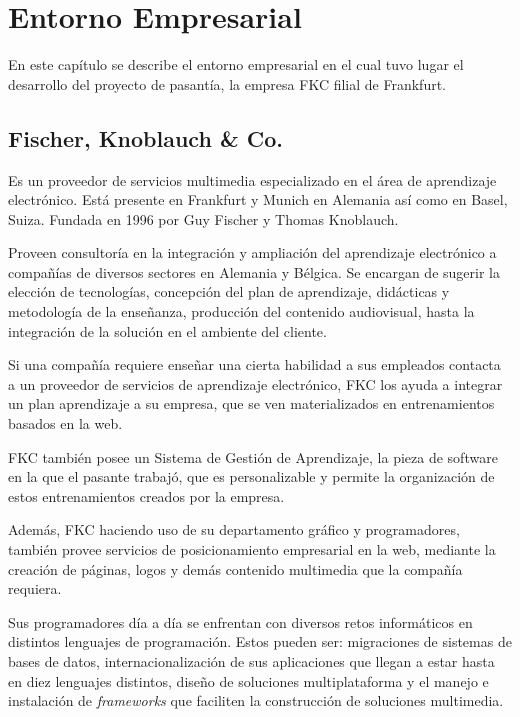 \chapter{Entorno Empresarial}
\thispagestyle{empty} %

En este capítulo se describe el entorno empresarial en el cual tuvo lugar el desarrollo del proyecto de pasantía, la empresa \gls{FKC} filial de Frankfurt.

\section{Fischer, Knoblauch \& Co.}

Es un proveedor de servicios multimedia especializado en el área de aprendizaje electrónico. Está presente en Frankfurt y Munich en Alemania así como en Basel, Suiza. Fundada en 1996 por Guy Fischer y Thomas Knoblauch.

Proveen consultoría en la integración y ampliación del aprendizaje electrónico a compañías de diversos sectores en Alemania y Bélgica. Se encargan de sugerir la elección de tecnologías, concepción del plan de aprendizaje, didácticas y metodología de la enseñanza, producción del contenido audiovisual, hasta la integración de la solución en el ambiente del cliente. 

Si una compañía requiere enseñar una cierta habilidad a sus empleados contacta a un proveedor de servicios de aprendizaje electrónico, \gls{FKC} los ayuda a integrar un plan aprendizaje a su empresa, que se ven materializados en entrenamientos basados en la web. 

\gls{FKC} también posee un Sistema de Gestión de Aprendizaje, la pieza de software en la que el pasante trabajó, que es personalizable y permite la organización de estos entrenamientos creados por la empresa.

Además, \gls{FKC} haciendo uso de su departamento gráfico y programadores, también provee servicios de posicionamiento empresarial en la web, mediante la creación de páginas, logos y demás contenido multimedia que la compañía requiera. 

Sus programadores día a día se enfrentan con diversos retos informáticos en distintos lenguajes de programación. Estos pueden ser: migraciones de sistemas de bases de datos, internacionalización de sus aplicaciones que llegan a estar hasta en diez lenguajes distintos, diseño de soluciones multiplataforma y el manejo e instalación de \emph{frameworks} que faciliten la construcción de soluciones multimedia.

